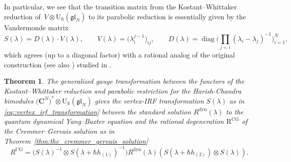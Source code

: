 \documentclass[10pt,a4paper]{amsart}
\numberwithin{equation}{section}
\newtheorem{Theorem}{Theorem}[section]
\newcommand{\CG}{\mathrm{CG}}
\newcommand{\C}{\mathbf{C}}
\newcommand{\R}{\mathrm{R}}
\newcommand{\U}{\mathrm{U}_{\hbar}}
\newcommand{\dyn}{\mathrm{dyn}}
\newcommand{\gl}{\mathfrak{gl}}
\begin{document}
	In particular, we see that the transition matrix from the Kostant--Whittaker reduction of~$V \otimes \U(\gl_N)$ to its parabolic reduction is essentially given by the Vandermonde matrix
	\begin{equation}
		\label{eq::vertex_irf_transformation}
		S(\lambda) = D(\lambda) \cdot V(\lambda), \qquad V(\lambda) = \bigl(\lambda_i^{j-1}\bigr)_{ij}, \qquad D(\lambda) = \operatorname{diag}\Big(\prod_{j<i} (\lambda_i-\lambda_j)^{-1} \Big)_{i=1}^N,
	\end{equation}
	which agrees (up to a diagonal factor) with a rational analog of the original construction \cite{CremmerGervais} (see also \cite{BuffenoirRocheTerras}) studied in \cite{BalogDabrowskiFeher}.
	
	\begin{Theorem}
		\label{thm:the_vertex_irf_transformation}
		The generalized gauge transformation between the functors of the Kostant--Whittaker reduction and parabolic restriction for the Harish-Chandra bimodules $\bigl(\C^N\bigr)^* \otimes \U(\gl_N)$ gives the vertex-IRF transformation $S(\lambda)$ as in \eqref{eq::vertex_irf_transformation} between the standard solution $R^{\dyn}(\lambda)$ to the quantum dynamical Yang--Baxter equation and the rational degeneration $\R^{\CG}$ of the Cremmer--Gervais solution as in Theorem~{\rm\ref{thm:the_cremmer_gervais_solution}}
		\[
		R^{\CG} = \bigl(S(\lambda)^{-1} \otimes S(\lambda+\hbar h_{(1)})^{-1} \bigr) R^{\dyn}(\lambda) (S(\lambda+\hbar h_{(2)}) \otimes S(\lambda)).
		\]
	\end{Theorem}
	
\end{document}
